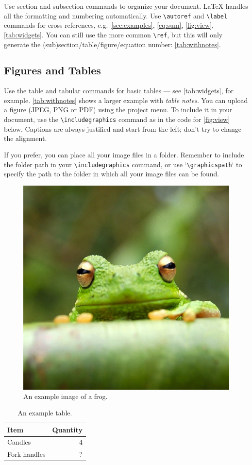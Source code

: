Use section and subsection commands to organize your document. \LaTeX{} handles all the formatting and numbering automatically. Use \verb|\autoref| and \verb|\label| commands for cross-references, e.g.~\autoref{sec:examples}, \autoref{eq:sum}, \autoref{fig:view}, \autoref{tab:widgets}. You can still use the more common \verb|\ref|, but this will only generate the (sub)section/table/figure/equation number: \ref{tab:withnotes}.

\subsection{Figures and Tables}

Use the table and tabular commands for basic tables --- see \autoref{tab:widgets}, for example. \autoref{tab:withnotes} shows a larger example with \emph{table notes}. You can upload a figure (JPEG, PNG or PDF) using the project menu. To include it in your document, use the \verb|\includegraphics| command as in the code for \autoref{fig:view} below. Captions are always justified and start from the left; don't try to change the alignment.

If you prefer, you can place all your image files in a folder. Remember to include the folder path in your \verb|\includegraphics| command, or use `\verb|\graphicspath|` to specify the path to the folder in which all your image files can be found.

\begin{figure}[ht]\centering
\includegraphics[width=0.5\linewidth]{frog}
\caption{An example image of a frog.}
\label{fig:view}
\end{figure}

\begin{table}[ht]\centering
\caption{An example table.}\label{tab:widgets}
\begin{tabular}{l r}
\toprule
Item & Quantity \\\midrule
Candles & 4 \\
Fork handles & ?\\
\bottomrule
\end{tabular}
\end{table}


